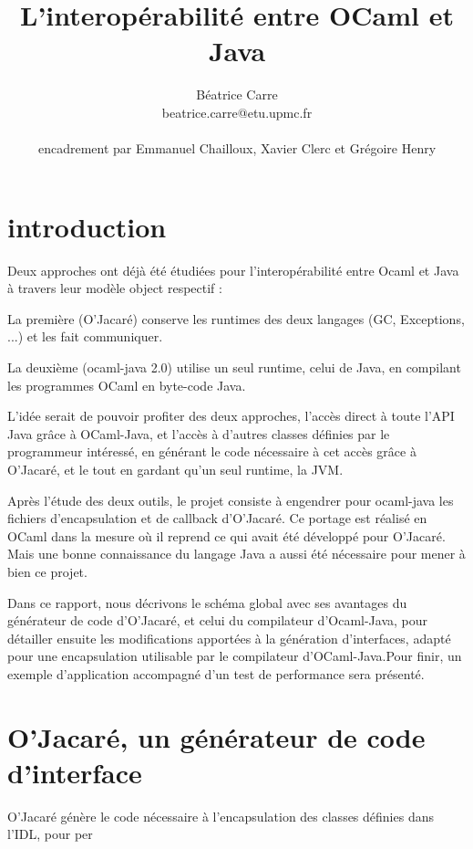 \documentclass[a4paper, 11pt, notitlepage]{article}
\title{
  \huge L'interopérabilité entre OCaml et Java\\
}
\author{
  Béatrice Carre \\
  beatrice.carre@etu.upmc.fr \\
  \\
  encadrement par Emmanuel Chailloux, Xavier Clerc et Grégoire Henry \\
}
\begin{document}
\maketitle
\tableofcontents
\newpage
\section*{introduction}
Deux approches ont déjà été étudiées pour l’interopérabilité entre
Ocaml et Java à travers leur modèle object respectif :

La première (O’Jacaré) conserve les runtimes des deux langages (GC,
Exceptions, ...) et les fait communiquer.

La deuxième (ocaml-java 2.0) utilise un seul runtime, celui de Java, en
compilant les programmes OCaml en byte-code Java.
\newline

L'idée serait de pouvoir profiter des deux approches, l'accès direct à toute
l'API Java grâce à OCaml-Java, et l'accès à d'autres classes définies
par le programmeur intéressé, en générant le code nécessaire à cet
accès grâce à O'Jacaré, et le tout en gardant qu'un seul runtime, la JVM.

Après l’étude des deux outils, le projet consiste à engendrer pour
ocaml-java les fichiers d’encapsulation et de callback d’O’Jacaré. Ce
portage est réalisé en OCaml dans la mesure où il reprend ce qui
avait été développé pour O’Jacaré. Mais une bonne connaissance du
langage Java a aussi été nécessaire pour mener à bien ce projet.
\newline

Dans ce rapport, nous décrivons le schéma global avec ses avantages du
générateur de code d'O'Jacaré, et celui du compilateur d'Ocaml-Java,
pour détailler ensuite les modifications apportées à la génération
d'interfaces, adapté pour une encapsulation utilisable par le
compilateur d'OCaml-Java.Pour finir, un exemple d'application accompagné d'un
test de performance sera présenté.











\section{O'Jacaré, un générateur de code d'interface}
O'Jacaré génère le code nécessaire à l'encapsulation des classes définies dans l'IDL, pour per
\end{document}
